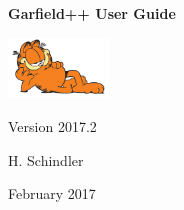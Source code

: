 \begin{titlepage}
  {
  \centering
  \sffamily
  \linespread{1.5}

  \vspace{3cm} 

  \huge{\textbf{Garfield++ User Guide}}

  \vspace{2cm}

  \includegraphics[width=0.2\textwidth]{garfield.jpg}

  \vspace{2cm}

  \large
  Version 2017.2 

  \vspace{2cm}
  \large
  H. Schindler

  \vfill

  February 2017

  }
\end{titlepage}
